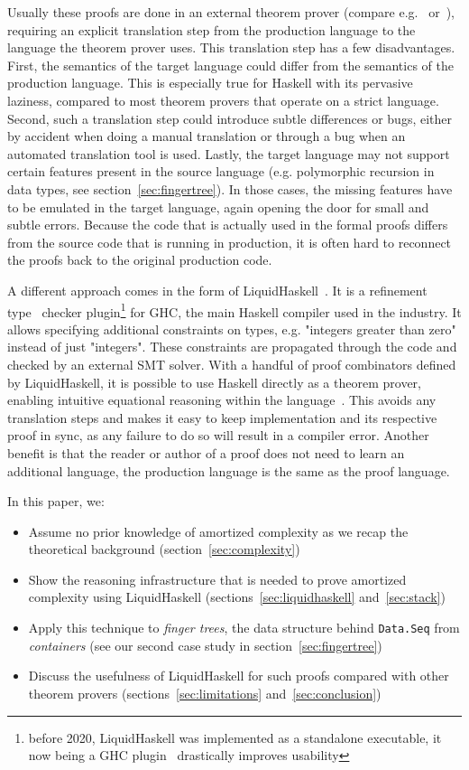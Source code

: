 \documentclass[sigplan,screen,review,anonymous]{acmart}
\begin{document}
Usually these proofs are done in an external theorem prover (compare e.g.~\cite{complexity_coq} or~\cite{complexity_isabelle}), requiring an explicit translation step from the production language to the language the theorem prover uses. This translation step has a few disadvantages. First, the semantics of the target language could differ from the semantics of the production language. This is especially true for Haskell with its pervasive laziness, compared to most theorem provers that operate on a strict language. Second, such a translation step could introduce subtle differences or bugs, either by accident when doing a manual translation or through a bug when an automated translation tool is used. Lastly, the target language may not support certain features present in the source language (e.g. polymorphic recursion in data types, see section~\ref{sec:fingertree}). In those cases, the missing features have to be emulated in the target language, again opening the door for small and subtle errors. Because the code that is actually used in the formal proofs differs from the source code that is running in production, it is often hard to reconnect the proofs back to the original production code.

A different approach comes in the form of LiquidHaskell~\cite{liquidhaskell}. It is a refinement type~\cite{refinement_types} checker plugin\footnote{before 2020, LiquidHaskell was implemented as a standalone executable, it now being a GHC plugin~\cite{lh_plugin} drastically improves usability} for GHC, the main Haskell compiler used in the industry. It allows specifying additional constraints on types, e.g. "integers greater than zero" instead of just "integers". These constraints are propagated through the code and checked by an external SMT solver. With a handful of proof combinators defined by LiquidHaskell, it is possible to use Haskell directly as a theorem prover, enabling intuitive equational reasoning within the language~\cite{tpfa}. This avoids any translation steps and makes it easy to keep implementation and its respective proof in sync, as any failure to do so will result in a compiler error. Another benefit is that the reader or author of a proof does not need to learn an additional language, the production language is the same as the proof language.

In this paper, we:
\begin{itemize}
\item{Assume no prior knowledge of amortized complexity as we recap the theoretical background (section~\ref{sec:complexity})}
\item{Show the reasoning infrastructure that is needed to prove amortized complexity using LiquidHaskell (sections~\ref{sec:liquidhaskell} and~\ref{sec:stack})}
\item{Apply this technique to \textit{finger trees}, the data structure behind \texttt{Data.Seq} from \textit{containers} (see our second case study in section~\ref{sec:fingertree})}
\item{Discuss the usefulness of LiquidHaskell for such proofs compared with other theorem provers (sections~\ref{sec:limitations} and~\ref{sec:conclusion})}
\end{itemize}
\end{document}
